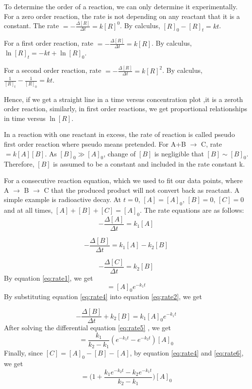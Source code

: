 To determine the order of a reaction, we can only determine it experimentally.
For a zero order reaction, the rate is not depending on any reactant that it is a constant. The rate $ = - \frac{\Delta [R]}{\Delta t} = k[R]^0$. By calculus, $[R]_0 - [R]_t = kt$.

For a first order reaction, rate $ = - \frac{\Delta [R]}{\Delta t} = k[R]$. By calculus, $\ln [R]_t = -kt + \ln [R]_0$.

For a second order reaction, rate $ = - \frac{\Delta [R]}{\Delta t} = k[R]^2$. By calculus, $\frac{1}{[R]_t} - \frac{1}{[R]_0} = kt$.

Hence, if we get a straight line in a time versus concentration plot ,it is a zeroth order reaction, similarly, in first order reactions, we get proportional relationships in time versus $\ln [R]$.

In a reaction with one reactant in excess, the rate of reaction is called pseudo first order reaction where pseudo means pretended. For A+B $\rightarrow$ C, rate $ = k[A][B]$. As $[B]_0 \gg [A]_0$, change of $[B]$ is negligible that $[B] \sim [B]_0$. Therefore, $[B]$ is assumed to be a constant and included in the rate constant k.

For a consecutive reaction equation, which we used to fit our data points, where A $\rightarrow$ B $\rightarrow$ C that the produced product will not convert back as reactant. A simple example is radioactive decay. At $t=0$, $[A]=[A]_0$, $[B]=0$, $[C]=0$ and at all times, $[A]+[B]+[C]=[A]_0$. The rate equations are as follows:
\begin{equation}
- \frac{\Delta [A]}{\Delta t} = k_1 [A]
\label{eq:rate1}
\end{equation}

\begin{equation}
- \frac{\Delta [B]}{\Delta t} = k_1 [A] - k_2 [B]
\label{eq:rate2}
\end{equation}

\begin{equation}
- \frac{\Delta [C]}{\Delta t} = k_2 [B]
\label{eq:rate3}
\end{equation}
By equation \ref{eq:rate1}, we get
\begin{equation}
[A] = [A]_0 e^{-k_1 t}
\label{eq:rate4}
\end{equation}
By substituting equation \ref{eq:rate4} into equation \ref{eq:rate2}, we get

\begin{equation}
- \frac{\Delta [B]}{\Delta t} + k_2 [B] = k_1 [A]_0 e^{-k_1 t}
\label{eq:rate5}
\end{equation}
After solving the differential equation \ref{eq:rate5} , we get
\begin{equation}
[B] = \frac{k_1}{k_2 - k_1} (e^{-k_1 t} - e^{-k_2 t}) [A]_0
\label{eq:rate6}
\end{equation}
Finally, since $[C]=[A]_0 -[B]-[A]$, by equation \ref{eq:rate4} and \ref{eq:rate6}, we get
\begin{equation}
[C] = \Bigg( 1+ \frac{k_1 e^{-k_2 t} - k_2 e^{-k_1 t}}{k_2 - k_1} \Bigg) [A]_0
\label{eq:rate7}
\end{equation}

